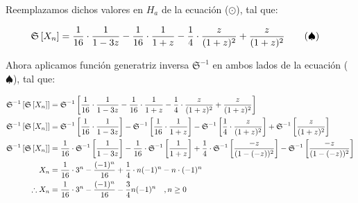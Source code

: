Reemplazamos dichos valores en $H_a$ de la ecuación ($\odot$), tal que:

\begin{align*}
    \mathfrak{S}\left[ X_n \right]&= \frac{1}{16} \cdot \frac{1}{1-3z} -\frac{1}{16}\cdot \frac{1}{1+z} -\frac{1}{4}\cdot \frac{z}{(1+z)^2} + \frac{z}{(1+z)^2} \tag{$\spadesuit$}
\end{align*}

Ahora aplicamos función generatriz inversa $\mathfrak{S}^{-1}$ en ambos lados de la ecuación ($\spadesuit$), tal que:

\begin{align*}
    \mathfrak{S}^{-1}\left[ \mathfrak{S}\left[ X_n \right] \right]&= \mathfrak{S}^{-1}\left[ \frac{1}{16} \cdot \frac{1}{1-3z} -\frac{1}{16}\cdot \frac{1}{1+z} -\frac{1}{4}\cdot \frac{z}{(1+z)^2} + \frac{z}{(1+z)^2}  \right]\\
    \mathfrak{S}^{-1}\left[ \mathfrak{S}\left[ X_n \right] \right]&= \mathfrak{S}^{-1}\left[ \frac{1}{16} \cdot \frac{1}{1-3z} \right] -\mathfrak{S}^{-1}\left[ \frac{1}{16}\cdot \frac{1}{1+z} \right] -\mathfrak{S}^{-1}\left[ \frac{1}{4}\cdot \frac{z}{(1+z)^2} \right] + \mathfrak{S}^{-1}\left[ \frac{z}{(1+z)^2} \right]\\
    \mathfrak{S}^{-1}\left[ \mathfrak{S}\left[ X_n \right] \right]&= \frac{1}{16} \cdot\mathfrak{S}^{-1}\left[ \frac{1}{1-3z} \right] -\frac{1}{16}\cdot\mathfrak{S}^{-1}\left[  \frac{1}{1+z} \right] +\frac{1}{4}\cdot\mathfrak{S}^{-1}\left[  \frac{-z}{(1-(-z))^2} \right] - \mathfrak{S}^{-1}\left[ \frac{-z}{(1-(-z))^2} \right]\\
    X_n &= \frac{1}{16}\cdot3^n - \frac{(-1)^n}{16}+\frac{1}{4}\cdot n(-1)^n - n\cdot(-1)^n\\
    \therefore X_n &= \frac{1}{16}\cdot3^n - \frac{(-1)^n}{16}-\frac{3}{4}n(-1)^n\quad,n\ge0
\end{align*}
